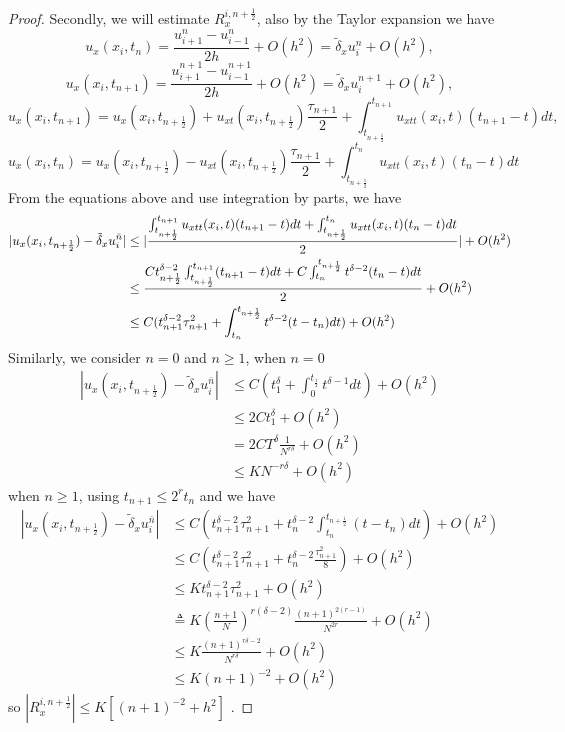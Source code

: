 \documentclass[10pt, reqno]{amsart}
\theoremstyle{remark}
\theoremstyle{definition}
\numberwithin{table}{section}
\begin{document}
\begin{proof}
Secondly, we will estimate $R_x^{i, n+\frac{1}{2}}$, also by the Taylor expansion we have
$$
u_x(x_i, t_n)=\frac{u_{i+1}^n-u_{i-1}^n}{2h}+O(h^2)=\tilde{\delta}_x u_i^n+O(h^2), 
$$
$$
u_x(x_i, t_{n+1})=\frac{u_{i+1}^{n+1}-u_{i-1}^{n+1}}{2h}+O(h^2)=\tilde{\delta}_x u_i^{n+1}+O(h^2), 
$$
$$
u_x(x_i, t_{n+1})=u_x(x_i, t_{n+\frac{1}{2}})+u_{xt}(x_i, t_{n+\frac{1}{2}})\frac{\tau_{n+1}}{2}+\int_{t_{n+\frac{1}{2}}}^{t_{n+1}}u_{xtt}(x_i, t)(t_{n+1}-t)dt, 
$$
$$
u_x(x_i, t_{n})=u_x(x_i, t_{n+\frac{1}{2}})-u_{xt}(x_i, t_{n+\frac{1}{2}})\frac{\tau_{n+1}}{2}+\int_{t_{n+\frac{1}{2}}}^{t_{n}}u_{xtt}(x_i, t)(t_{n}-t)dt
$$
From the equations above and use integration by parts, we have
\begin{align}
    |u_x(x_i, t_{n+\frac{1}{2}})-\tilde{\delta}_xu_i^{\bar{n}}|&\leq |\frac{\int_{t_{n+\frac{1}{2}}}^{t_{n+1}}u_{xtt}(x_i, t)(t_{n+1}-t)dt+\int_{t_{n+\frac{1}{2}}}^{t_{n}}u_{xtt}(x_i, t)(t_{n}-t)dt}{2}|+O(h^2)\notag\\
    &\leq \frac{Ct_{n+\frac{1}{2}}^{\delta-2}\int_{t_{n+\frac{1}{2}}}^{t_{n+1}}(t_{n+1}-t)dt+C\int^{t_{n+\frac{1}{2}}}_{t_{n}}t^{\delta-2}(t_{n}-t)dt}{2}+O(h^2)\notag\\
    &\leq C(t_{n+1}^{\delta-2}\tau_{n+1}^2+\int^{t_{n+\frac{1}{2}}}_{t_{n}}t^{\delta-2}(t-t_{n})dt)+O(h^2)\label{yijiechashang}
\end{align}
Similarly, we consider $n=0$ and $n\geq 1$, when $n=0$
\begin{align*}
    |u_x(x_i, t_{n+\frac{1}{2}})-\tilde{\delta}_xu_i^{\bar{n}}|&\leq C(t_1^\delta+\int_0^{t_{\frac{1}{2}}}t^{\delta-1}dt)+O(h^2)\\
    &\leq 2Ct_1^\delta+O(h^2)\\
    &=2CT^\delta\frac{1}{N^{r\delta}}+O(h^2)\\
    &\leq KN^{-r\delta}+O(h^2)
\end{align*}
when $n\geq 1$, using $t_{n+1}\leq 2^rt_n$ and we have
\begin{align*}
    |u_x(x_i, t_{n+\frac{1}{2}})-\tilde{\delta}_xu_i^{\bar{n}}|&\leq C(t_{n+1}^{\delta-2}\tau_{n+1}^2+t_n^{\delta-2}\int^{t_{n+\frac{1}{2}}}_{t_{n}}(t-t_{n})dt)+O(h^2)\\
    &\leq C(t_{n+1}^{\delta-2}\tau_{n+1}^2+t_n^{\delta-2}\frac{\tau_{n+1}^2}{8})+O(h^2)\\
    &\leq Kt_{n+1}^{\delta-2}\tau_{n+1}^2+O(h^2)\\
    &\triangleq{} K(\frac{n+1}{N})^{r(\delta-2)}\frac{(n+1)^{2(r-1)}}{N^{2r}}+O(h^2)\\
    &\leq K\frac{(n+1)^{r\delta-2}}{N^{r\delta}}+O(h^2)\\
    &\leq K(n+1)^{-2}+O(h^2)
\end{align*}
so $|R_x^{i, n+\frac{1}{2}}|\leq K[(n+1)^{-2}+h^2]$ . 


\end{proof}
\end{document}

